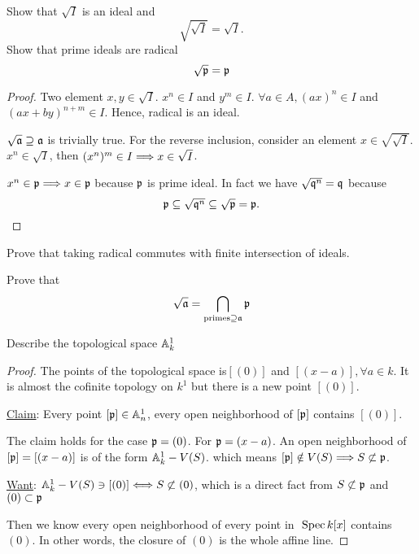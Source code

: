 \begin{exr}
Show that $\sqrt I$ is an ideal and
$$
\sqrt {\sqrt I}=\sqrt I.
$$
Show that prime ideals are radical
$$
\sqrt {{\mathfrak p}}={\mathfrak p}
$$
\end{exr}
\begin{proof}
Two element $x,y\in \sqrt I$.
$x^n\in I$ and $y^m\in I$. $\forall a\in A, (ax)^n\in I$ and $(ax+by)^{n+m}\in I$. Hence, radical is an ideal.

$\sqrt{{\mathfrak a}}\supseteq {\mathfrak a}$ is trivially true. For the reverse inclusion, consider an element $x\in \sqrt{\sqrt I}$. $x^n\in \sqrt I$, then $(x^n)^m\in I\Longrightarrow x\in \sqrt I$.

$x^n\in{\mathfrak p}\Longrightarrow x\in {\mathfrak p}$ because ${\mathfrak p}$ is prime ideal. 
In fact we have $\sqrt{\mathfrak q^n}=\mathfrak q$ because 
$$
{\mathfrak p}\subseteq \sqrt{\mathfrak q^n}\subseteq\sqrt{{\mathfrak p}}={\mathfrak p}.$$
\end{proof}

\begin{exr}
Prove that taking radical commutes with finite intersection of ideals.
\end{exr}

\begin{exr}
Prove that 
$$
\sqrt{{\mathfrak a}}=\bigcap_{\text{primes}\supseteq {\mathfrak a} }{\mathfrak p}
$$
\end{exr}

\begin{exr}
Describe the topological space $\mathbb A^1_k$
\end{exr}
\begin{proof}
The points of the topological space is$[(0)]$ and $[(x-a)],\forall a\in k$. It is almost the cofinite topology on $k^1$ but there is a new point $[(0)]$. 

\underline{Claim}: Every point $[{\mathfrak p}]\in \mathbb A^1_n$, every open neighborhood of $[{\mathfrak p}]$ contains $[(0)]$.

The claim holds for the case ${\mathfrak p}=(0)$. For ${\mathfrak p}=(x-a)$. An open neighborhood of $[{\mathfrak p}]=[(x-a)]$ is of the form $\mathbb A^1_k-V(S)$. which means $[{\mathfrak p}]\notin V(S)\Longrightarrow S\not \subset{\mathfrak p}$.

\underline{Want}: $\mathbb A^1_k-V(S)\ni [(0)]\Longleftrightarrow S\not \subset (0)$, which is a direct fact from $S\not \subset {\mathfrak p}$ and $(0)\subset {\mathfrak p}$

Then we know every open neighborhood of every point in $\text{ Spec\,} k[x]$ contains $(0)$. In other words, the closure of $(0)$ is the whole affine line.
\end{proof}

